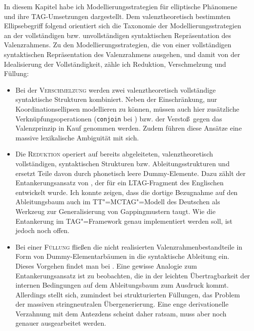 In diesem Kapitel habe ich Modellierungsstrategien für elliptische Phänomene und ihre TAG-Umsetzungen dargestellt. Dem valenztheoretisch bestimmten Ellipsebegriff folgend orientiert sich die Taxonomie der Modellierungsstrategien an der vollständigen bzw. unvollständigen syntaktischen Repräsentation des Valenzrahmens. %
Zu den Modellierungsstrategien, die von einer vollständigen syntaktischen Repräsentation des Valenzrahmens ausgehen, und damit von der Idealisierung der Vollständigkeit, zähle ich Reduktion, Verschmelzung und Füllung:
\begin{itemize}
  \item Bei der \textsc{Verschmelzung} werden zwei valenztheoretisch vollständige syntaktische Strukturen kombiniert. Neben der Einschränkung, nur Koordinationsellipsen modellieren zu können, müssen auch hier zusätzliche Verknüpfungsoperationen ({\tt conjoin} bei \citealt{Sarkar:Joshi:96,Sarkar:Joshi:97}) bzw. der Versto\ss\ gegen das Valenzprinzip \citep{Seddah:08,Seddah:etal:10} in Kauf genommen werden. Zudem führen diese Ansätze eine massive lexikalische Ambiguität mit sich.  
  \item Die \textsc{Reduktion} operiert auf bereits abgeleiteten, valenztheoretisch vollständigen, syntaktischen Strukturen bzw. Ableitungsstrukturen und ersetzt Teile davon durch phonetisch leere Dummy-Elemente. Dazu zählt der Entankerungsansatz von \cite{Lichte:Kallmeyer:10}, der für ein LTAG-Fragment des Englischen entwickelt wurde. Ich konnte zeigen, dass die dortige Bezugnahme auf den Ableitungsbaum auch im TT"=MCTAG"=Modell des Deutschen als Werkzeug zur Generalisierung von Gappingmustern taugt. Wie die Entankerung im TAG"=Framework genau implementiert werden soll, ist jedoch noch offen.
  \item Bei einer \textsc{Füllung} flie\ss en die nicht realisierten Valenzrahmenbestandteile in Form von Dummy-Elementarbäumen in die syntaktische Ableitung ein. Dieses Vorgehen findet man bei \cite{Seddah:Sagot:06}. Eine gewisse Analogie zum Entankerungsansatz ist zu beobachten, die in der leichten Übertragbarkeit der internen Bedingungen auf dem Ableitungsbaum zum Ausdruck kommt. Allerdings stellt sich, zumindest bei strukturierten Füllungen, das Problem der massiven stringneutralen Übergenerierung. Eine enge derivationelle Verzahnung mit dem Antezdens scheint daher ratsam, muss aber noch genauer ausgearbeitet werden. 
\end{itemize}
